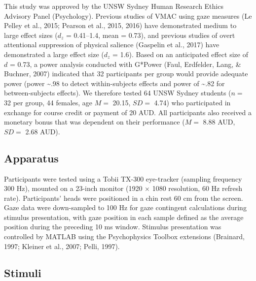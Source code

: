 \documentclass[man, a4paper, noextraspace, 11pt,floatsintext]{apa6}
\theoremstyle{definition}
\theoremstyle{definition}
\theoremstyle{definition}
\theoremstyle{remark}
\begin{document}
This study was approved by the UNSW Sydney Human Research Ethics
Advisory Panel (Psychology). Previous studies of VMAC using gaze
measures (Le Pelley et al., 2015; Pearson et al., 2015, 2016) have
demonstrated medium to large effect sizes (\(d_z\) = 0.41--1.4, mean =
0.73), and previous studies of overt attentional suppression of physical
salience (Gaspelin et al., 2017) have demonstrated a large effect size
(\(d_z\) = 1.6). Based on an anticipated effect size of \(d\) = 0.73, a
power analysis conducted with G*Power (Faul, Erdfelder, Lang, \&
Buchner, 2007) indicated that 32 participants per group would provide
adequate power (power \textasciitilde{}.98 to detect within-subjects
effects and power of \textasciitilde{}.82 for between-subjects effects).
We therefore tested 64 UNSW Sydney students (\(n =\) 32 per group, 44
females, age \(M=\) 20.15, \(SD=\) 4.74) who participated in exchange
for course credit or payment of 20 AUD. All participants also received a
monetary bonus that was dependent on their performance (\(M =\) 8.88
AUD, \(SD =\) 2.68 AUD).

\subsection{Apparatus}\label{apparatus}

Participants were tested using a Tobii TX-300 eye-tracker (sampling
frequency 300 Hz), mounted on a 23-inch monitor (1920 \(\times\) 1080
resolution, 60 Hz refresh rate). Participants' heads were positioned in
a chin rest 60 cm from the screen. Gaze data were down-sampled to 100 Hz
for gaze contingent calculations during stimulus presentation, with gaze
position in each sample defined as the average position during the
preceding 10 ms window. Stimulus presentation was controlled by MATLAB
using the Psychophysics Toolbox extensions (Brainard, 1997; Kleiner et
al., 2007; Pelli, 1997).

\subsection{Stimuli}\label{stimuli}
\end{document}
